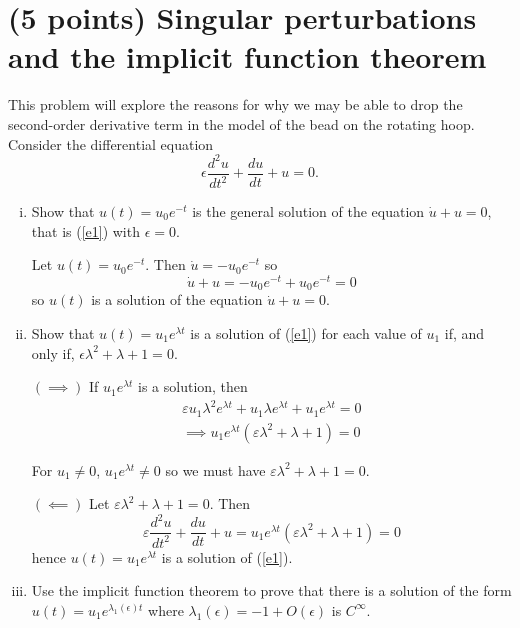 \documentclass[12pt]{article}
\newcommand{\ep}{\varepsilon}
\begin{document}
\pagebreak


\section{(5 points) Singular perturbations and the implicit function theorem}

This problem will explore the reasons for why we may be able to drop the second-order derivative term in the model of the bead on the rotating hoop. Consider the differential equation
\begin{equation}\label{e1}
    \epsilon \frac{d^2 u}{dt^2} + \frac{d u}{d t} + u = 0.
\end{equation}
\begin{enumerate}[(i)]
    \item Show that $u(t)=u_0e^{-t}$ is the general solution of the equation $\dot{u}+u=0$, that is (\ref{e1}) with $\epsilon=0$.

          \color{blue}
          Let $u(t) = u_0 e^{-t}$. Then $\dot u = -u_0 e^{-t}$ so
          \[\dot u + u = -u_0 e^{-t} + u_0 e^{-t} = 0\]
          so $u(t)$ is a solution of the equation $\dot u + u = 0$.
          \color{black}

    \item Show that $u(t)=u_1e^{\lambda t}$ is a solution of (\ref{e1}) for each value of $u_1$ if, and only if, $\epsilon\lambda^2+\lambda+1=0$.

          \color{blue}
          $(\implies)$ If $u_1 e^{\lambda t}$ is a solution, then
          \begin{align*}
              \ep u_1 \lambda^2 e^{\lambda t} + u_1 \lambda e^{\lambda t} + u_1 e^{\lambda t} = 0 \\
              \implies u_1 e^{\lambda t} (\ep \lambda^2 + \lambda + 1) = 0
          \end{align*}

          For $u_1 \neq 0$, $u_1 e^{\lambda t} \neq 0$ so we must have $\ep \lambda^2 + \lambda + 1 = 0$.

          $(\impliedby)$ Let $\ep \lambda^2 + \lambda + 1 =0$. Then
          \[\ep \frac{d^2 u}{dt^2} + \frac{d u}{d t} + u = u_1 e^{\lambda t} (\ep \lambda^2 + \lambda + 1) = 0\]
          hence $u(t) = u_1 e^{\lambda t}$ is a solution of (\ref{e1}).
          \color{black}

    \item Use the implicit function theorem to prove that there is a solution of the form $u(t)=u_1 e^{\lambda_1(\epsilon)t}$ where $\lambda_1(\epsilon)=-1+O(\epsilon)$ is $C^\infty$.


\end{enumerate}
\end{document}
